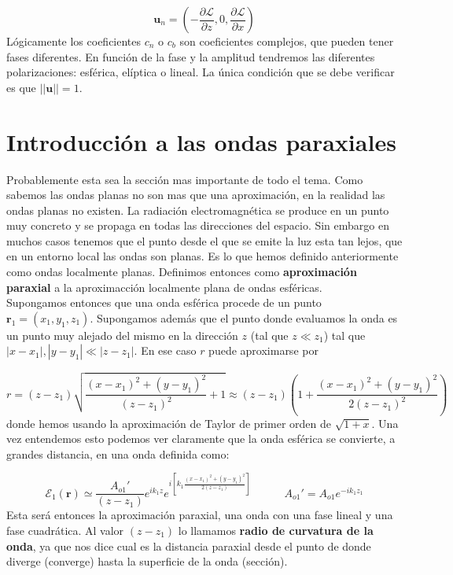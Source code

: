 \documentclass[12pt,a4paper]{book}
\numberwithin{equation}{section}
\numberwithin{figure}{section}
\newcommand{\tquad}{\quad \quad \quad}
\newcommand{\parentesis}[1]{\left( #1  \right)}
\newcommand{\parciales}[2]{\frac{\partial #1}{\partial #2}}
\newcommand{\ccorchetes}[1]{\left[ #1  \right]}
\newcommand{\1}{_{(1)}}
\newcommand{\2}{_{(2)}}
\newcommand{\un}{\mathbf{u}}
\newcommand{\rn}{\mathbf{r}}
\theoremstyle{definition}
\begin{document}
\begin{equation}
\un_n = \parentesis{ - \parciales{\mathcal{L}}{z} , 0 , \parciales{\mathcal{L}}{x}} 
\end{equation}
Lógicamente los coeficientes $c_n$ o $c_b$ son coeficientes complejos, que pueden tener fases diferentes. En función de la fase y la amplitud tendremos las diferentes polarizaciones: esférica, elíptica o lineal. La única condición que se debe verificar es que $||\un||=1$. 

\section{Introducción a las ondas paraxiales}

Probablemente esta sea la sección mas importante de todo el tema. Como sabemos las ondas planas no son mas que una aproximación, en la realidad las ondas planas no existen. La radiación electromagnética se produce en un punto muy concreto y se propaga en todas las direcciones del espacio. Sin embargo en muchos casos tenemos que el punto desde el que se emite la luz esta tan lejos, que en un entorno local las ondas son planas. Es lo que hemos definido anteriormente como ondas localmente planas. Definimos entonces como \textbf{aproximación paraxial} a la aproximacción localmente plana de ondas esféricas. \\ 

Supongamos entonces que una onda esférica procede de un punto $\rn_1 = (x_1,y_1,z_1)$. Supongamos además que el punto donde evaluamos la onda es   un punto muy alejado del mismo en la dirección $z$ (tal que $z \ll z_1$) tal que $|x-x_1|,|y-y_1| \ll |z-z_1|$. En ese caso $r$ puede aproximarse por

\begin{equation}
r = (z-z_1) \sqrt{\frac{(x-x_1)^2+ (y-y_1)^2}{(z-z_1)^2} + 1} \approx(z-z_1) \parentesis{1+\dfrac{(x-x_1)^2 + (y-y_1)^2}{2 (z-z_1)^2}}
\end{equation}
donde hemos usando la aproximación de Taylor de primer orden de $\sqrt{1+x}$. Una vez entendemos esto podemos ver claramente que la onda esférica se convierte, a grandes distancia, en una onda definida como:

\begin{equation}
\mathcal{E}_1 (\rn) \simeq \dfrac{A_{o1}'}{(z-z_1)} e^{i k_1 z} e^{i \ccorchetes{k_1 \frac{(x-x_1)^2+(y-y_1)^2}{2 (z-z_1)}}} \tquad A_{o1}' = A_{o1} e^{- i k_1 z_1}
\end{equation}
Esta será entonces la aproximación paraxial, una onda con una fase lineal y una fase cuadrática. Al valor $(z-z_1)$ lo llamamos \textbf{radio de curvatura de la onda}, ya que nos dice cual es la distancia paraxial desde el punto de donde diverge (converge) hasta la superficie de la onda (sección). \\
\end{document}
